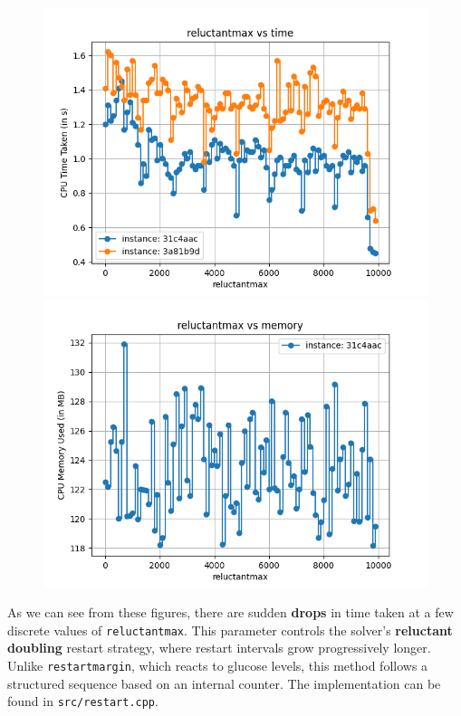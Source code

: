 \documentclass{article}
\begin{document}
    \begin{figure}[H]
        \centering
        \begin{minipage}{0.45\textwidth}
            \centering
            \includegraphics[width = \linewidth]{reluctantmax-0.png}
        \end{minipage}
        \hfill
        \begin{minipage}{0.45\textwidth}
            \centering
            \includegraphics[width = \linewidth]{reluctantmax-1.png}
        \end{minipage}
    \end{figure}
    As we can see from these figures, there are sudden \textbf{drops} in time
    taken at a few discrete values of \texttt{reluctantmax}. This parameter
    controls the solver's \textbf{reluctant doubling} restart strategy, where
    restart intervals grow progressively longer. Unlike \texttt{restartmargin},
    which reacts to glucose levels, this method follows a structured sequence
    based on an internal counter. The implementation can be found in
    \texttt{src/restart.cpp}.
\end{document}
